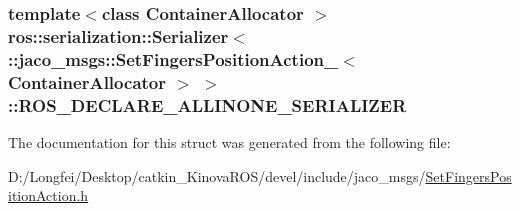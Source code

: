 \subsubsection[{\texorpdfstring{R\+O\+S\+\_\+\+D\+E\+C\+L\+A\+R\+E\+\_\+\+A\+L\+L\+I\+N\+O\+N\+E\+\_\+\+S\+E\+R\+I\+A\+L\+I\+Z\+ER}{ROS_DECLARE_ALLINONE_SERIALIZER}}]{\setlength{\rightskip}{0pt plus 5cm}template$<$class Container\+Allocator $>$ ros\+::serialization\+::\+Serializer$<$ \+::{\bf jaco\+\_\+msgs\+::\+Set\+Fingers\+Position\+Action\+\_\+}$<$ Container\+Allocator $>$ $>$\+::R\+O\+S\+\_\+\+D\+E\+C\+L\+A\+R\+E\+\_\+\+A\+L\+L\+I\+N\+O\+N\+E\+\_\+\+S\+E\+R\+I\+A\+L\+I\+Z\+ER}\hypertarget{structros_1_1serialization_1_1Serializer_3_01_1_1jaco__msgs_1_1SetFingersPositionAction___3_01ContainerAllocator_01_4_01_4_a522ca42c2eece65fc41867613d55cf03}{}\label{structros_1_1serialization_1_1Serializer_3_01_1_1jaco__msgs_1_1SetFingersPositionAction___3_01ContainerAllocator_01_4_01_4_a522ca42c2eece65fc41867613d55cf03}


The documentation for this struct was generated from the following file\+:\begin{DoxyCompactItemize}
\item 
D\+:/\+Longfei/\+Desktop/catkin\+\_\+\+Kinova\+R\+O\+S/devel/include/jaco\+\_\+msgs/\hyperlink{SetFingersPositionAction_8h}{Set\+Fingers\+Position\+Action.\+h}\end{DoxyCompactItemize}
